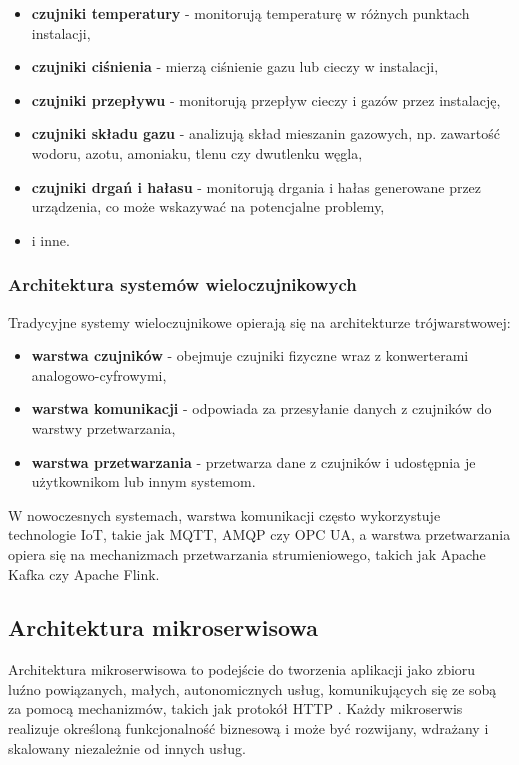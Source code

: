 \begin{itemize}
    \item \textbf{czujniki temperatury} - monitorują temperaturę w różnych punktach instalacji,
    \item \textbf{czujniki ciśnienia} - mierzą ciśnienie gazu lub cieczy w instalacji,
    \item \textbf{czujniki przepływu} - monitorują przepływ cieczy i gazów przez instalację,
    \item \textbf{czujniki składu gazu} - analizują skład mieszanin gazowych, np. zawartość wodoru, azotu, amoniaku, tlenu czy dwutlenku węgla,
    \item \textbf{czujniki drgań i hałasu} - monitorują drgania i hałas generowane przez urządzenia, co może wskazywać na potencjalne problemy,
    \item i inne.
\end{itemize}

\subsubsection{Architektura systemów wieloczujnikowych}
\label{subsubsec:architektura_systemow}

Tradycyjne systemy wieloczujnikowe opierają się na architekturze trójwarstwowej:

\begin{itemize}
    \item \textbf{warstwa czujników} - obejmuje czujniki fizyczne wraz z konwerterami analogowo-cyfrowymi,
    \item \textbf{warstwa komunikacji} - odpowiada za przesyłanie danych z czujników do warstwy przetwarzania,
    \item \textbf{warstwa przetwarzania} - przetwarza dane z czujników i udostępnia je użytkownikom lub innym systemom.
\end{itemize}

W nowoczesnych systemach, warstwa komunikacji często wykorzystuje technologie IoT, takie jak MQTT, AMQP czy OPC UA,
a warstwa przetwarzania opiera się na mechanizmach przetwarzania strumieniowego, takich jak Apache Kafka czy Apache Flink.


\subsection{Architektura mikroserwisowa}
\label{subsec:architektura_mikroserwisowa}

Architektura mikroserwisowa to podejście do tworzenia aplikacji jako zbioru luźno powiązanych, małych, autonomicznych usług,
komunikujących się ze sobą za pomocą mechanizmów, takich jak protokół HTTP \citep{microservice_architecture}.
Każdy mikroserwis realizuje określoną funkcjonalność biznesową i może być rozwijany, wdrażany i skalowany niezależnie od innych usług.


